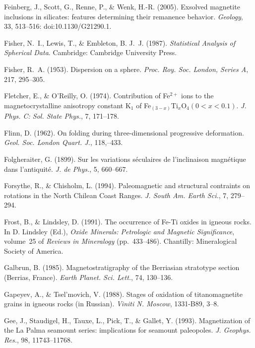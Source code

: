 \documentclass[,plain]{tauxe}
\begin{document}
\begin{thebibliography}{}
\bibitem{}%
Feinberg, J., Scott, G., Renne, P., \& Wenk, H.-R. (2005).
Exsolved magnetite inclusions in silicates: features determining their remanence behavior.
{\it Geology}, 33, 513--516: doi:10.1130/G21290.1.

\bibitem{}%
Fisher, N.~I., Lewis, T., \& Embleton, B. J.~J. (1987).
{\it Statistical Analysis of Spherical Data}.
Cambridge: Cambridge University Press.

\bibitem{}%
Fisher, R.~A. (1953).
Dispersion on a sphere.
{\it Proc. Roy. Soc. London, Series A}, 217, 295--305.

\bibitem{}%
Fletcher, E., \& O'Reilly, O. (1974).
Contribution of Fe$^{2+}$ ions to the magnetocrystalline anisotropy constant K$_1$ of Fe$_{(3-x)}$Ti$_x$O$_4 (0<x<0.1)$.
{\it J. Phys. C: Sol. State Phys.}, 7, 171--178.

\bibitem{}%
Flinn, D. (1962).
On folding during three-dimensional progressive deformation.
{\it Geol. Soc. London Quart. J.}, 118,--433.

\bibitem{}%
Folgheraiter, G. (1899).
Sur les variations s\'eculaires de l'inclinaison magn\'etique dans l'antiquit\'e.
{\it J. de Phys.}, 5, 660--667.

\bibitem{}%
Forsythe, R., \& Chisholm, L. (1994).
Paleomagnetic and structural contraints on rotations in the North Chilean Coast Ranges.
{\it J. South Am. Earth Sci.}, 7, 279--294.

\bibitem{}%
Frost, B., \& Lindsley, D. (1991).
The occurrence of Fe-Ti oxides in igneous rocks.
In D. Lindsley (Ed.), {\it Oxide Minerals: Petrologic and Magnetic
Significance}, volume~25 of {\it Reviews in Mineralogy} (pp.\ 433--486). Chantilly: Mineralogical Society of America.

\bibitem{}%
Galbrun, B. (1985).
Magnetostratigraphy of the Berriasian stratotype section (Berrias, France).
{\it Earth Planet. Sci. Lett.}, 74, 130--136.

\bibitem{}%
Gapeyev, A., \& Tsel'movich, V. (1988).
Stages of oxidation of titanomagnetite grains in igneous rocks (in Russian).
{\it Viniti N. Moscow}, 1331-B89, 3--8.

\bibitem{}%
Gee, J., Staudigel, H., Tauxe, L., Pick, T., \& Gallet, Y. (1993).
Magnetization of the La Palma seamount series: implications for seamount paleopoles.
{\it J. Geophys. Res.}, 98, 11743--11768.


\end{thebibliography}
\end{document}
